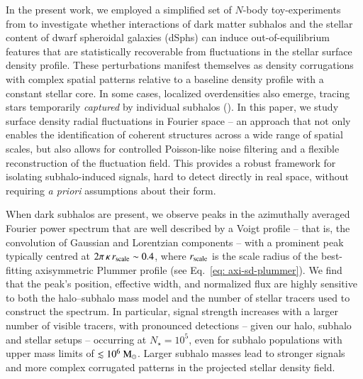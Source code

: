 \documentclass[fleqn,usenatbib]{mnras}
\newcommand{\msun}{\rm M_\odot}
\begin{document}
In the present work, we employed a simplified set of $N$-body toy-experiments from \cite{Penarrubia+25} to investigate whether interactions of dark matter subhalos and the stellar content of dwarf spheroidal galaxies (dSphs) can induce out-of-equilibrium features that are statistically recoverable from fluctuations in the stellar surface density profile.
These perturbations manifest themselves as density corrugations with complex spatial patterns relative to a baseline density profile with a constant stellar core. In some cases, localized overdensities also emerge, tracing stars temporarily \textit{captured} by individual subhalos (\citealt{Penarrubia+24}). In this paper, we study surface density radial fluctuations in Fourier space -- an approach that not only enables the identification of coherent structures across a wide range of spatial scales, 
but also allows for controlled Poisson-like noise filtering and a flexible reconstruction of the fluctuation field. This provides a robust framework for isolating subhalo-induced signals, hard to detect directly in real space, without requiring \textit{a priori} assumptions about their form.

When dark subhalos are present, we observe peaks in the azimuthally averaged Fourier power spectrum that are well described by a Voigt profile -- that is, the convolution of Gaussian and Lorentzian components -- with a prominent peak typically centred at $2 \pi \, \kappa \, r_{\rm scale} \sim 0.4$, where $r_{\rm scale}$ is the scale radius of the best-fitting axisymmetric Plummer profile (see Eq.~\ref{eq: axi-sd-plummer}). We find that the peak's position, effective width, and normalized flux are highly sensitive to both the halo–subhalo mass model and the number of stellar tracers used to construct the spectrum. In particular, signal strength increases with a larger number of visible tracers, with pronounced detections -- given our halo, subhalo and stellar setups -- occurring at $N_{\star} = 10^{5}$, even for subhalo populations with upper mass limits of $\lesssim 10^{6}~\msun$. Larger subhalo masses lead to stronger signals and more complex corrugated patterns in the projected stellar density field. 
\end{document}
